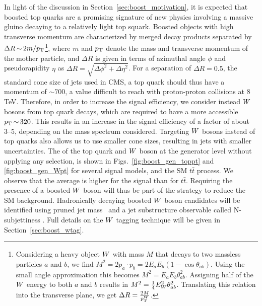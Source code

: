 

In light of the discussion in Section~\ref{sec:boost_motivation}, it is expected that boosted top
quarks are a promising signature of new physics involving a massive gluino decaying to a relatively
light top squark.
Boosted objects with high transverse momentum are characterized by merged decay products
separated by $ \Delta R \,{\sim}\, 2m/p_{\mathrm{T}}$\footnote{Considering a heavy object $W$ with mass $M$
that decays to two massless particles $a$ and $b$, we find $M^2 = 2 p_a \cdot p_b = 2 E_a E_b (1
- \cos{\theta_{ab}})$. Using the small angle approximation this becomes $M^2 = E_a E_b
\theta_{ab}^2$. Assigning half of the $W$ energy to both $a$ and $b$ results in $M^2 =
\frac{1}{4} E_{W}^2 \theta_{ab}^2$. Translating this relation into the transverse plane, we get
$\Delta R = \frac{2 M}{p_{\mathrm{T}}^{W}}$.}, 
where $m$ and $p_{\mathrm{T}}$ denote the mass and transverse momentum of the mother particle, and $\Delta R$
is given in terms of azimuthal angle $\phi$ and pseudorapidity $\eta$ as $\Delta R = \sqrt{\Delta
\phi^2 + \Delta \eta^2}$.
For a separation of $\Delta R = 0.5$, the standard cone size of jets used in CMS, a top
quark should thus have a momentum of ${\sim}700$\GeV, a value difficult to reach with proton-proton
collisions at 8 TeV. 
Therefore, in order to increase the signal efficiency, we consider instead $W$ bosons from top
quark decays, which are required to have a more accessible $p_{\mathrm{T}} \,{\sim}\, 320$\GeV.  This results
in an increase in the signal efficiency of a factor of about 3--5, depending on the mass
spectrum considered. 
Targeting $W$ bosons instead of top quarks also allows us to use smaller cone sizes, resulting in
jets with smaller uncertainties.
The \pt of the top quark and $W$ boson at the generator
level without applying any selection, is shown in Figs.~\ref{fig:boost_gen_toppt} and
\ref{fig:boost_gen_Wpt} for several signal models, and the SM $t\bar{t}$ process. 
We observe that the average \pt is higher for the signal than for $t\bar{t}$. Requiring the
presence of a boosted $W$ boson will thus be part of the strategy to reduce the SM background.
Hadronically decaying boosted $W$ boson candidates will be identified using pruned jet
mass~\cite{Ellis:2009su,Ellis:2009me,Chatrchyan:2013vbb} and a jet substructure observable
called N-subjettiness \cite{Thaler:2010tr}. Full details on the $W$ tagging technique will be given
in Section~\ref{sec:boost_wtag}. 

